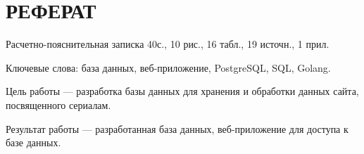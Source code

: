 \chapter*{РЕФЕРАТ}

Расчетно-пояснительная записка 40с., 10 рис., 16 табл., 19 источн., 1 прил.

Ключевые слова: база данных, веб-приложение, PostgreSQL, SQL, Golang.

Цель работы --- разработка базы данных для хранения и обработки данных сайта, посвященного сериалам.

Результат работы --- разработанная база данных, веб-приложение для доступа к базе данных. 
